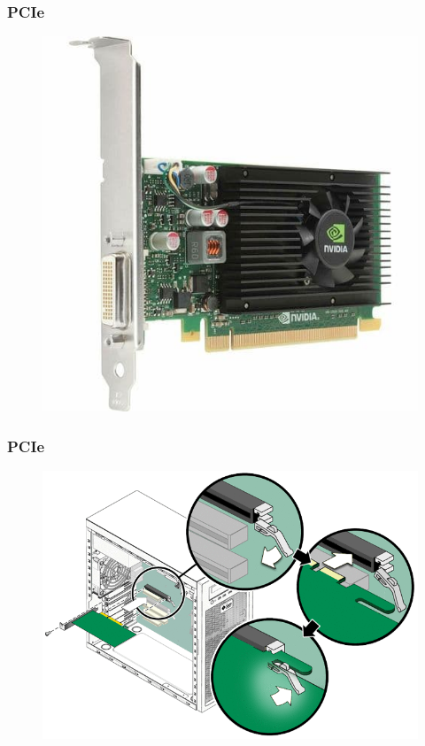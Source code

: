 \begin{frame}
	\frametitle{PCIe}
	
	\begin{figure}[!htbp]
		\centering
		\includegraphics[width=0.6\linewidth]{images/6_bus/PCIeVideoCard.jpg}
	\end{figure}
\end{frame}


\begin{frame}
	\frametitle{PCIe}
	
	\begin{figure}[!htbp]
		\centering
		\includegraphics[width=0.8\linewidth]{images/6_bus/PCIeInstall.png}
	\end{figure}
\end{frame}



